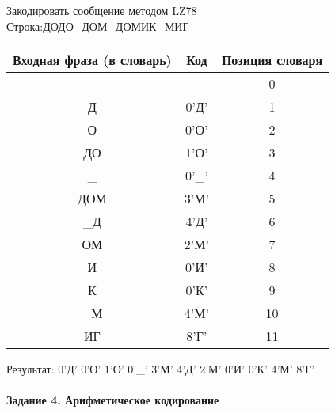 \documentclass[a4paper, 12pt]{article}
\begin{document}
Закодировать сообщение методом LZ78\\
Строка:ДОДО\_ДОМ\_ДОМИК\_МИГ\\
\begin{table}[h!]
\centering
\begin{tabular}{|c|c|c|} 
\hline
 Входная фраза (в словарь) & Код & Позиция словаря \\ \hline

 &  & 0 \\ \hline
Д & 0'Д' & 1 \\ \hline
О & 0'О' & 2 \\ \hline
ДО & 1'О' & 3 \\ \hline
\_ & 0'\_' & 4 \\ \hline
ДОМ & 3'М' & 5 \\ \hline
\_Д & 4'Д' & 6 \\ \hline
ОМ & 2'М' & 7 \\ \hline
И & 0'И' & 8 \\ \hline
К & 0'К' & 9 \\ \hline
\_М & 4'М' & 10 \\ \hline
ИГ & 8'Г' & 11 \\ \hline
\end{tabular}
\end{table}

Результат: 0'Д' 0'О' 1'О' 0'\_' 3'М' 4'Д' 2'М' 0'И' 0'К' 4'М' 8'Г'\\
\pagebreak
\paragraph{Задание 4. Арифметическое кодирование\\}
\end{document}
